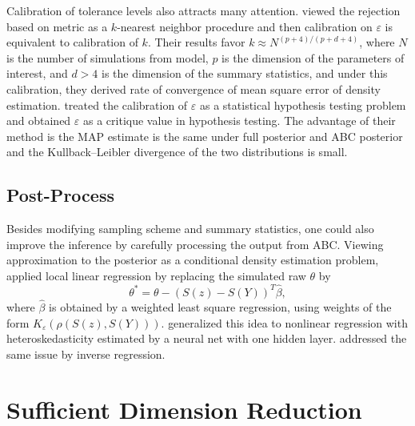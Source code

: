 Calibration of tolerance levels also attracts many attention. \citet{biau2012new}
viewed the rejection based on metric as a $k$-nearest neighbor procedure
and then calibration on $\varepsilon$ is equivalent to calibration
of $k$. Their results favor $k\approx N^{\left(p+4\right)/\left(p+d+4\right)}$,
where $N$ is the number of simulations from model, $p$ is the dimension
of the parameters of interest, and $d>4$ is the dimension of the
summary statistics, and under this calibration, they derived rate
of convergence of mean square error of density estimation. \citet{ratmann2013statistical}
treated the calibration of $\varepsilon$ as a statistical hypothesis
testing problem and obtained $\varepsilon$ as a critique value in
hypothesis testing. The advantage of their method is the MAP estimate
is the same under full posterior and ABC posterior and the Kullback--Leibler
divergence of the two distributions is small. 


\subsection{Post-Process}

Besides modifying sampling scheme and summary statistics, one could
also improve the inference by carefully processing the output from
ABC. Viewing approximation to the posterior as a conditional density
estimation problem, \citet{beaumont2002approximate} applied local
linear regression by replacing the simulated raw $\theta$ by 
\[
\theta^{*}=\theta-\left(S\left(z\right)-S\left(Y\right)\right)^{T}\hat{\beta},
\]
where $\hat{\beta}$ is obtained by a weighted least square regression,
using weights of the form $K_{\varepsilon}\left(\rho\left(S\left(z\right),S\left(Y\right)\right)\right)$.
\citet{blum2010non} generalized this idea to nonlinear regression
with heteroskedasticity estimated by a neural net with one hidden
layer. \citet{leuenberger2010bayesian} addressed the same issue by
inverse regression.


\section{Sufficient Dimension Reduction}



